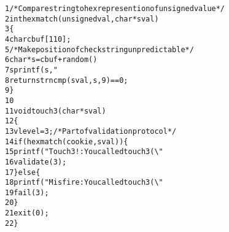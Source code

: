 \begin{alltt}
{\scriptsize   1} /* Compare string to hex represention of unsigned value */
{\scriptsize   2} int hexmatch(unsigned val, char *sval)
{\scriptsize   3} \verb:{:
{\scriptsize   4}     char cbuf[110];
{\scriptsize   5}     /* Make position of check string unpredictable */
{\scriptsize   6}     char *s = cbuf + random() % 100;
{\scriptsize   7}     sprintf(s, "%.8x", val);
{\scriptsize   8}     return strncmp(sval, s, 9) == 0;
{\scriptsize   9} \verb:}:
{\scriptsize  10} 
{\scriptsize  11} void touch3(char *sval)
{\scriptsize  12} \verb:{:
{\scriptsize  13}     vlevel = 3;       /* Part of validation protocol */
{\scriptsize  14}     if (hexmatch(cookie, sval)) \verb:{:
{\scriptsize  15}         printf("Touch3!: You called touch3(\verb:\":%s\verb:\":)\verb:\n:", sval);
{\scriptsize  16}         validate(3);
{\scriptsize  17}     \verb:}: else \verb:{:
{\scriptsize  18}         printf("Misfire: You called touch3(\verb:\":%s\verb:\":)\verb:\n:", sval);
{\scriptsize  19}         fail(3);
{\scriptsize  20}     \verb:}:
{\scriptsize  21}     exit(0);
{\scriptsize  22} \verb:}:
\end{alltt}
